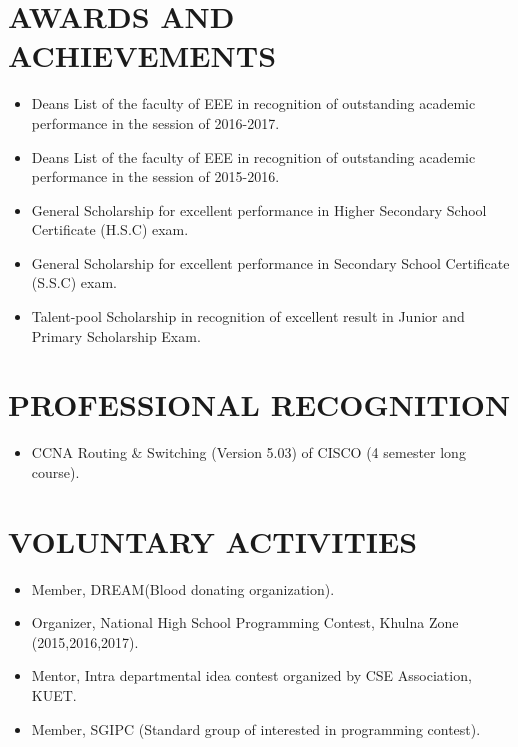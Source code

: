 \documentclass[11pt,a4paper,roman]{moderncv}        %
\begin{document}
\section{AWARDS AND ACHIEVEMENTS}
\begin{minipage}{\maincolumnwidth}%
	\small{
    	\begin{itemize}
          \item Deans List of the faculty of EEE in recognition of outstanding academic performance in the session of 2016-2017.
          \vspace{1mm}
          \item Deans List of the faculty of EEE in recognition of outstanding academic performance in the session of 2015-2016.
          \vspace{1mm}
          \item General Scholarship for excellent performance in Higher Secondary School Certificate (H.S.C) exam.
          \vspace{1mm}
          \item General Scholarship for excellent performance in  Secondary School Certificate (S.S.C) exam.
          \vspace{1mm}
          \item Talent-pool Scholarship in recognition of excellent result in Junior and Primary Scholarship Exam.
		\end{itemize}}%
\end{minipage}%

\section{PROFESSIONAL RECOGNITION}
\begin{itemize}
    \item CCNA Routing \& Switching (Version 5.03) of CISCO (4 semester long course).
\end{itemize}



\section{VOLUNTARY ACTIVITIES}
\begin{itemize}
    \item Member, DREAM(Blood donating organization).
    \vspace{1mm}
    \item Organizer, National High School Programming Contest, Khulna Zone (2015,2016,2017).
     \vspace{1mm}
    \item Mentor, Intra departmental idea contest organized by CSE Association, KUET.
     \vspace{1mm}
    \item Member, SGIPC (Standard group of interested in programming contest).
\end{itemize}
\end{document}
